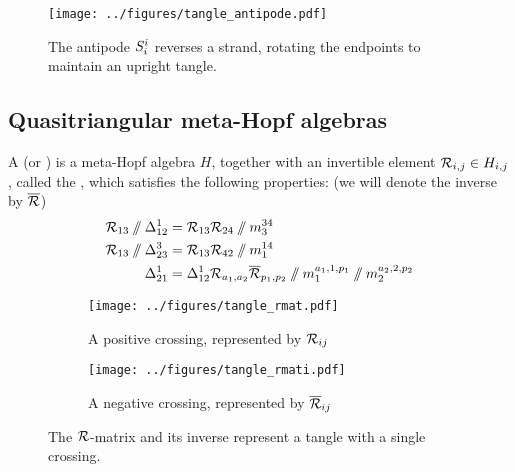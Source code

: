 \documentclass{beamer}
\theoremstyle{theorem}
\begin{document}
\begin{frame}
        \begin{figure}
        \centering
        \texttt{[image: ../figures/tangle\_antipode.pdf]}
        \caption{The antipode $S^{i}_{i}$ reverses a strand, rotating the
        endpoints to maintain an upright tangle.}
        \label{fig:tangle_antipode}
\end{figure}
\end{frame}

\subsection{Quasitriangular meta-Hopf algebras}

\begin{frame}
        \begin{definition}
        A  (or ) is a meta-Hopf algebra $H$, together with an invertible element
        $\mathcal{R}_{i,j} \in H_{i,j}$, called the , which satisfies the
        following properties: (we will denote the inverse by $\overline{\mathcal{R}}$)
        \begin{align}
                \label{eq:Rmat_understrand}
                \Rmat_{13}\then\comult^{1}_{12}&=\Rmat_{13}\Rmat_{24}\then\mult^{34}_3\\
                \label{eq:Rmat_overstrand}
                \Rmat_{13}\then\comult^{3}_{23}&=\Rmat_{13}\Rmat_{42}\then\mult^{14}_1\\
                \label{eq:Rmat_comult}
                \comult^{1}_{21} &=
                        \comult^{1}_{12} \Rmat_{a_1,a_2}\Rmati_{p_1,p_2}\then
                        \mult^{a_1,1,p_1}_{1}\then \mult^{a_2,2,p_2}_{2}
        \end{align}
        \end{definition}
\end{frame}

\begin{frame}
        \begin{figure}
                \centering
                \begin{subfigure}[b]{0.4\textwidth}
                        \centering
                        \texttt{[image: ../figures/tangle\_rmat.pdf]}
                        \caption{A positive crossing, represented by $\mathcal{R}_{ij}$}
                        \label{fig:tangle_rmat}
                \end{subfigure}
                \begin{subfigure}[b]{0.4\textwidth}
                        \centering
                        \texttt{[image: ../figures/tangle\_rmati.pdf]}
                        \caption{A negative crossing, represented by $\overline{\mathcal{R}}_{ij}$}
                        \label{fig:tangle_rmati}
                \end{subfigure}
                \caption{The $\mathcal{R}$-matrix and its inverse represent a tangle with a
                single crossing.}
                \label{fig:tangle_rmats}
        \end{figure}
\end{frame}
\end{document}
